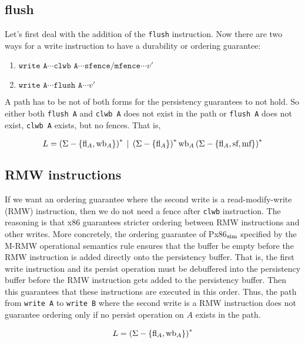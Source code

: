 \documentclass[11pt]{article}
\begin{document}
\subsection{flush}
Let's first deal with the addition of the \texttt{flush} instruction. Now there are two ways for a write instruction to have a durability or ordering guarantee: 

\begin{enumerate}
    \item $\texttt{write A} \cdots \texttt{clwb A} \cdots \texttt{sfence}/\texttt{mfence} \cdots v'$
    \item $\texttt{write A} \cdots \texttt{flush A} \cdots v'$
\end{enumerate}

A path has to be not of both forms for the persistency guarantees to not hold. So either both \texttt{flush A} and \texttt{clwb A} does not exist in the path or \texttt{flush A} does not exist, \texttt{clwb A} exists, but no fences. That is,

\[L = \left( \Sigma - \left\{ \textnormal{fl}_A, \textnormal{wb}_A \right\} \right)^* \;\vert\; \left( \Sigma - \left\{ \textnormal{fl}_A \right\} \right)^* \textnormal{wb}_A \left( \Sigma - \left\{ \textnormal{fl}_A, \textnormal{sf}, \textnormal{mf} \right\} \right)^*\]

\subsection{RMW instructions}
If we want an ordering guarantee where the second write is a read-modify-write (RMW) instruction, then we do not need a fence after \texttt{clwb} instruction. The reasoning is that x86 guarantees stricter ordering between RMW instructions and other writes. More concretely, the ordering guarantee of Px86$_{\textnormal{sim}}$ specified by the M-RMW operational semantics rule ensures that the buffer be empty before the RMW instruction is added directly onto the persistency buffer. That is, the first write instruction and its persist operation must be debuffered into the persistency buffer before the RMW instruction gets added to the persistency buffer. Then this guarantees that these instructions are executed in this order. Thus, the path from \texttt{write A} to \texttt{write B} where the second write is a RMW instruction does not guarantee ordering only if no persist operation on $A$ exists in the path.

\[
    L = \left( \Sigma - \left\{ \textnormal{fl}_A, \textnormal{wb}_A \right\} \right)^* 
\]
\end{document}
